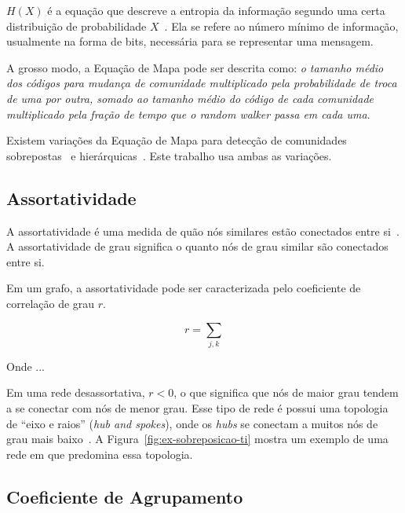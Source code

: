 \documentclass[
  article,
  11pt,
  a4paper,
  english,
  brazil,
  sumario=tradicional]{abntex2}
\begin{document}
$H(X)$ é a equação que descreve a entropia da informação segundo uma certa distribuição de probabilidade $X$~\cite{Shannon1948-ic}. Ela se refere ao número mínimo de informação, usualmente na forma de bits, necessária para se representar uma mensagem.

A grosso modo, a Equação de Mapa pode ser descrita como: \textit{o tamanho médio dos códigos para mudança de comunidade multiplicado pela probabilidade de troca de uma por outra, somado ao tamanho médio do código de cada comunidade multiplicado pela fração de tempo que o \textit{random walker} passa em cada uma}.

Existem variações da Equação de Mapa para detecção de comunidades sobrepostas~\cite{Viamontes_Esquivel2011-it} e hierárquicas~\cite{Rosvall2011-yi}. Este trabalho usa ambas as variações.

\subsection{Assortatividade} \label{sec:assortatividade}

A assortatividade é uma medida de quão nós similares estão conectados entre si~\cite{Newman2003-jn}. A assortatividade de grau significa o quanto nós de grau similar são conectados entre si.

Em um grafo, a assortatividade pode ser caracterizada pelo coeficiente de correlação de grau $r$.

\begin{equation*}
r = \sum_{j,k}
\end{equation*}

Onde ...

Em uma rede desassortativa, $r < 0$, o que significa que nós de maior grau tendem a se conectar com nós de menor grau. Esse tipo de rede é possui uma topologia de \enquote{eixo e raios} (\textit{hub and spokes}), onde os \textit{hubs} se conectam a muitos nós de grau mais baixo~\cite{Barabasi2016-rn}. A Figura~\ref{fig:ex-sobreposicao-ti} mostra um exemplo de uma rede em que predomina essa topologia.

\subsection{Coeficiente de Agrupamento} \label{sec:coef-agrupamento}

\end{document}
